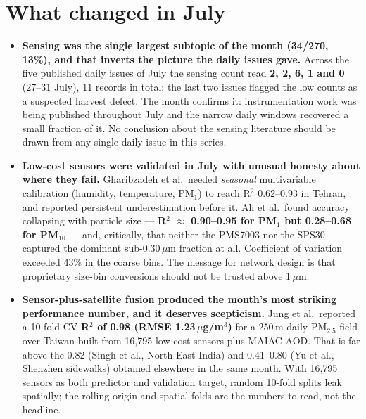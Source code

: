 \documentclass[10pt]{article}
\begin{document}
\vspace{3mm}

\section*{\sffamily\bfseries\color{Deep}What changed in July}
\vspace{-1.5mm}{\color{Coral}\rule{\linewidth}{1.1pt}}\vspace{2.5mm}

\footnotesize
\begin{itemize}
\item \textbf{Sensing was the single largest subtopic of the month (34/270, 13\%), and
that inverts the picture the daily issues gave.} Across the five published daily issues
of July the sensing count read \textbf{2, 2, 6, 1 and 0} (27--31 July), 11 records in
total; the last two issues flagged the low counts as a suspected harvest defect. The month confirms
it: instrumentation work was being published throughout July and the narrow daily windows
recovered a small fraction of it. No conclusion about the sensing literature should be
drawn from any single daily issue in this series.

\item \textbf{Low-cost sensors were validated in July with unusual honesty about where
they fail.} Gharibzadeh et al.\ needed \emph{seasonal} multivariable calibration
(humidity, temperature, PM$_1$) to reach R$^2$ 0.62--0.93 in Tehran, and reported
persistent underestimation before it. Ali et al.\ found accuracy collapsing with particle
size --- \textbf{R$^2$ $\approx$ 0.90--0.95 for PM$_1$ but 0.28--0.68 for PM$_{10}$} ---
and, critically, that neither the PMS7003 nor the SPS30 captured the dominant
sub-0.30\,$\mu$m fraction at all. Coefficient of variation exceeded 43\% in the coarse
bins. The message for network design is that proprietary size-bin conversions should not
be trusted above 1\,$\mu$m.

\item \textbf{Sensor-plus-satellite fusion produced the month's most striking
performance number, and it deserves scepticism.} Jung et al.\ reported a 10-fold CV
\textbf{R$^2$ of 0.98 (RMSE 1.23\,$\mu$g/m$^3$)} for a 250\,m daily PM$_{2.5}$ field over
Taiwan built from 16{,}795 low-cost sensors plus MAIAC AOD. That is far above the
0.82 (Singh et al., North-East India) and 0.41--0.80 (Yu et al., Shenzhen sidewalks)
obtained elsewhere in the same month. With 16{,}795 sensors as both predictor and
validation target, random 10-fold splits leak spatially; the rolling-origin and spatial
folds are the numbers to read, not the headline.


\end{itemize}
\end{document}
